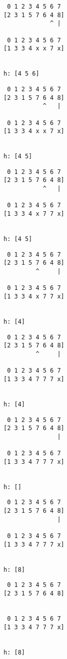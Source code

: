 { \begin{verbatim}
 0 1 2 3 4 5 6 7
[2 3 1 5 7 6 4 8]
             ^ |

 0 1 2 3 4 5 6 7
[1 3 3 4 x x 7 x]


h: [4 5 6]
\end{verbatim} }

{ \begin{verbatim}
 0 1 2 3 4 5 6 7
[2 3 1 5 7 6 4 8]
           ^   |

 0 1 2 3 4 5 6 7
[1 3 3 4 x x 7 x]


h: [4 5]
\end{verbatim} }

{ \begin{verbatim}
 0 1 2 3 4 5 6 7
[2 3 1 5 7 6 4 8]
           ^   |

 0 1 2 3 4 5 6 7
[1 3 3 4 x 7 7 x]


h: [4 5]
\end{verbatim} }

{ \begin{verbatim}
 0 1 2 3 4 5 6 7
[2 3 1 5 7 6 4 8]
         ^     |

 0 1 2 3 4 5 6 7
[1 3 3 4 x 7 7 x]


h: [4]
\end{verbatim} }

{ \begin{verbatim}
 0 1 2 3 4 5 6 7
[2 3 1 5 7 6 4 8]
         ^     |

 0 1 2 3 4 5 6 7
[1 3 3 4 7 7 7 x]


h: [4]
\end{verbatim} }

{ \begin{verbatim}
 0 1 2 3 4 5 6 7
[2 3 1 5 7 6 4 8]
               |

 0 1 2 3 4 5 6 7
[1 3 3 4 7 7 7 x]


h: []
\end{verbatim} }

{ \begin{verbatim}
 0 1 2 3 4 5 6 7
[2 3 1 5 7 6 4 8]
               |

 0 1 2 3 4 5 6 7
[1 3 3 4 7 7 7 x]


h: [8]
\end{verbatim} }

{ \begin{verbatim}
 0 1 2 3 4 5 6 7
[2 3 1 5 7 6 4 8]


 0 1 2 3 4 5 6 7
[1 3 3 4 7 7 7 x]


h: [8]
\end{verbatim} }

